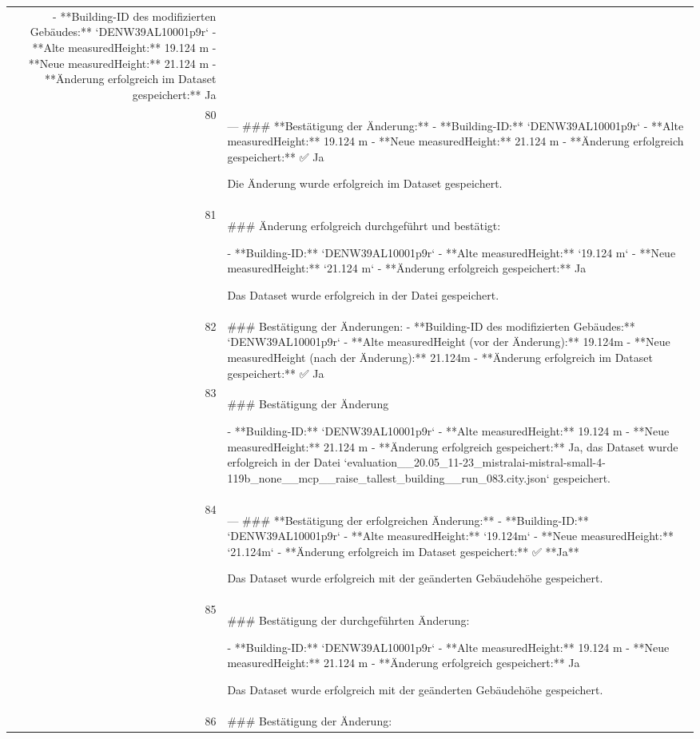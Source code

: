 \documentclass[a4paper,11pt]{article}
\begin{document}
\begin{table}[ht]
\begin{tabular}{r p{12cm}}
- **Building-ID des modifizierten Gebäudes:** `DENW39AL10001p9r`
- **Alte measuredHeight:** 19.124 m
- **Neue measuredHeight:** 21.124 m
- **Änderung erfolgreich im Dataset gespeichert:** Ja \\
80 & ---
\#\#\# **Bestätigung der Änderung:**
- **Building-ID:** `DENW39AL10001p9r`
- **Alte measuredHeight:** 19.124 m
- **Neue measuredHeight:** 21.124 m
- **Änderung erfolgreich gespeichert:** ✅ Ja

Die Änderung wurde erfolgreich im Dataset gespeichert. \\
81 & \#\#\# Änderung erfolgreich durchgeführt und bestätigt:

- **Building-ID:** `DENW39AL10001p9r`
- **Alte measuredHeight:** `19.124 m`
- **Neue measuredHeight:** `21.124 m`
- **Änderung erfolgreich gespeichert:** Ja

Das Dataset wurde erfolgreich in der Datei gespeichert. \\
82 & \#\#\# Bestätigung der Änderungen:
- **Building-ID des modifizierten Gebäudes:** `DENW39AL10001p9r`
- **Alte measuredHeight (vor der Änderung):** 19.124m
- **Neue measuredHeight (nach der Änderung):** 21.124m
- **Änderung erfolgreich im Dataset gespeichert:** ✅ Ja \\
83 & \#\#\# Bestätigung der Änderung

- **Building-ID:** `DENW39AL10001p9r`
- **Alte measuredHeight:** 19.124 m
- **Neue measuredHeight:** 21.124 m
- **Änderung erfolgreich gespeichert:** Ja, das Dataset wurde erfolgreich in der Datei `evaluation\_\_20.05\_11-23\_mistralai-mistral-small-4-119b\_none\_\_mcp\_\_raise\_tallest\_building\_\_run\_083.city.json` gespeichert. \\
84 & ---
\#\#\# **Bestätigung der erfolgreichen Änderung:**
- **Building-ID:** `DENW39AL10001p9r`
- **Alte measuredHeight:** `19.124m`
- **Neue measuredHeight:** `21.124m`
- **Änderung erfolgreich im Dataset gespeichert:** ✅ **Ja**

Das Dataset wurde erfolgreich mit der geänderten Gebäudehöhe gespeichert. \\
85 & \#\#\# Bestätigung der durchgeführten Änderung:

- **Building-ID:** `DENW39AL10001p9r`
- **Alte measuredHeight:** 19.124 m
- **Neue measuredHeight:** 21.124 m
- **Änderung erfolgreich gespeichert:** Ja

Das Dataset wurde erfolgreich mit der geänderten Gebäudehöhe gespeichert. \\
86 & \#\#\# Bestätigung der Änderung:


\end{tabular}
\end{table}
\end{document}
